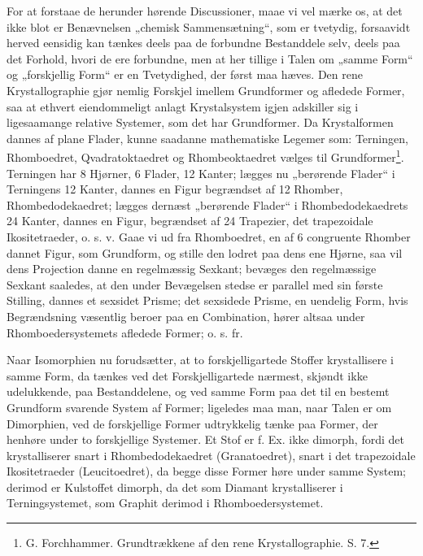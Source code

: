 \documentclass[12pt,a4paper]{book}
\begin{document}
For at forstaae de herunder hørende Discussioner, maae
vi vel mærke os, at det ikke blot er Benævnelsen „chemisk
\setcounter{footnote}{0}
Sammensætning“, som er tvetydig, forsaavidt herved eensidig
kan tænkes deels paa de forbundne Bestanddele selv, deels paa
det Forhold, hvori de ere forbundne, men at her tillige i
Talen om „samme Form“ og „forskjellig Form“ er en Tvetydighed,
der først maa hæves. Den rene Krystallographie
gjør nemlig Forskjel imellem Grundformer og afledede Former,
saa at ethvert eiendommeligt anlagt Krystalsystem igjen adskiller
sig i ligesaamange relative Systemer, som det har
Grundformer. Da Krystalformen dannes af plane Flader,
kunne saadanne mathematiske Legemer som: Terningen,
Rhomboedret, Qvadratoktaedret og Rhombeoktaedret vælges til
Grundformer\footnote{G. Forchhammer. Grundtrækkene af den rene
Krystallographie. S. 7.}.
Terningen har 8 Hjørner, 6 Flader, 12
Kanter; lægges nu „berørende Flader“ i Terningens 12
Kanter, dannes en Figur begrændset af 12 Rhomber, Rhombedodekaedret;
lægges dernæst „berørende Flader“ i Rhombedodekaedrets
24 Kanter, dannes en Figur, begrændset af 24
Trapezier, det trapezoidale Ikositetraeder, o. s. v. Gaae vi ud
fra Rhomboedret, en af 6 congruente Rhomber dannet Figur,
som Grundform, og stille den lodret paa dens ene Hjørne,
saa vil dens Projection danne en regelmæssig Sexkant; bevæges
den regelmæssige Sexkant saaledes, at den under Bevægelsen
stedse er parallel med sin første Stilling, dannes et
sexsidet Prisme; det sexsidede Prisme, en uendelig Form, hvis
Begrændsning væsentlig beroer paa en Combination, hører altsaa
under Rhomboedersystemets afledede Former; o. s. fr.

Naar Isomorphien nu forudsætter, at to forskjelligartede
Stoffer krystallisere i samme Form, da tænkes ved det
Forskjelligartede nærmest, skjøndt ikke udelukkende, paa Bestanddelene,
og ved samme Form paa det til en bestemt Grundform
svarende System af Former; ligeledes maa man, naar
Talen er om Dimorphien, ved de forskjellige Former udtrykkelig
tænke paa Former, der henhøre under to forskjellige
\setcounter{footnote}{0}
Systemer. Et Stof er f. Ex. ikke dimorph, fordi det krystalliserer
snart i Rhombedodekaedret (Granatoedret), snart i det
trapezoidale Ikositetraeder (Leucitoedret), da begge disse Former
høre under samme System; derimod er Kulstoffet dimorph,
da det som Diamant krystalliserer i Terningsystemet, som
Graphit derimod i Rhomboedersystemet.
\end{document}
